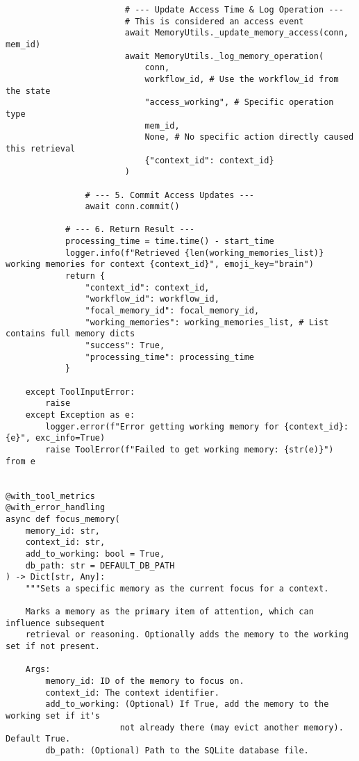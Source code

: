 \documentclass[12pt,a4paper]{article}
\begin{document}
\begin{pageablecode}
\begin{verbatim}
                        # --- Update Access Time & Log Operation ---
                        # This is considered an access event
                        await MemoryUtils._update_memory_access(conn, mem_id)
                        await MemoryUtils._log_memory_operation(
                            conn,
                            workflow_id, # Use the workflow_id from the state
                            "access_working", # Specific operation type
                            mem_id,
                            None, # No specific action directly caused this retrieval
                            {"context_id": context_id}
                        )

                # --- 5. Commit Access Updates ---
                await conn.commit()

            # --- 6. Return Result ---
            processing_time = time.time() - start_time
            logger.info(f"Retrieved {len(working_memories_list)} working memories for context {context_id}", emoji_key="brain")
            return {
                "context_id": context_id,
                "workflow_id": workflow_id,
                "focal_memory_id": focal_memory_id,
                "working_memories": working_memories_list, # List contains full memory dicts
                "success": True,
                "processing_time": processing_time
            }

    except ToolInputError:
        raise
    except Exception as e:
        logger.error(f"Error getting working memory for {context_id}: {e}", exc_info=True)
        raise ToolError(f"Failed to get working memory: {str(e)}") from e


@with_tool_metrics
@with_error_handling
async def focus_memory(
    memory_id: str,
    context_id: str,
    add_to_working: bool = True,
    db_path: str = DEFAULT_DB_PATH
) -> Dict[str, Any]:
    """Sets a specific memory as the current focus for a context.

    Marks a memory as the primary item of attention, which can influence subsequent
    retrieval or reasoning. Optionally adds the memory to the working set if not present.

    Args:
        memory_id: ID of the memory to focus on.
        context_id: The context identifier.
        add_to_working: (Optional) If True, add the memory to the working set if it's
                       not already there (may evict another memory). Default True.
        db_path: (Optional) Path to the SQLite database file.


\end{verbatim}
\end{pageablecode}
\end{document}
